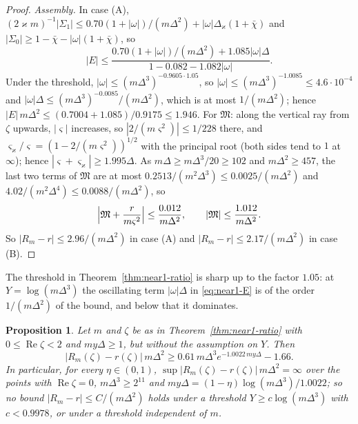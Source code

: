 \documentclass[11pt]{amsart}
\newtheorem{proposition}[theorem]{Proposition}
\theoremstyle{definition}
\theoremstyle{remark}
\numberwithin{equation}{section}
\DeclareMathOperator{\re}{Re}
\begin{document}
\begin{proof}
\emph{Assembly.} In case (A), $(2\varkappa m)^{-1}|\Sigma_1|\le0.70(1+|\omega|)/(m\Delta^2)+|\omega|\Delta_\varkappa(1+\bar\chi)$ and $|\Sigma_0|\ge1-\bar\chi-|\omega|(1+\bar\chi)$, so
\begin{equation}\label{eq:near1-E}
|E|\le\frac{0.70(1+|\omega|)/(m\Delta^2)+1.085|\omega|\Delta}{1-0.082-1.082|\omega|}.
\end{equation}
Under the threshold, $|\omega|\le(m\Delta^3)^{-0.9605\cdot1.05}$, so $|\omega|\le(m\Delta^3)^{-1.0085}\le4.6\cdot10^{-4}$ and $|\omega|\Delta\le(m\Delta^3)^{-0.0085}/(m\Delta^2)$, which is at most $1/(m\Delta^2)$; hence $|E|\,m\Delta^2\le(0.7004+1.085)/0.9175\le1.946$. For $\mathfrak M$: along the vertical ray from $\zeta$ upwards, $|\varsigma|$ increases, so $|2/(m\varsigma^2)|\le1/228$ there, and $\varsigma_\varkappa/\varsigma=(1-2/(m\varsigma^2))^{1/2}$ with the principal root (both sides tend to $1$ at $\infty$); hence $|\varsigma+\varsigma_\varkappa|\ge1.995\Delta$. As $m\Delta\ge m\Delta^3/20\ge102$ and $m\Delta^2\ge457$, the last two terms of $\mathfrak M$ are at most $0.2513/(m^2\Delta^3)\le0.0025/(m\Delta^2)$ and $4.02/(m^2\Delta^4)\le0.0088/(m\Delta^2)$, so
\begin{equation}\label{eq:near1-M}
\Bigl|\mathfrak M+\frac r{m\varsigma^2}\Bigr|\le\frac{0.012}{m\Delta^2},\qquad|\mathfrak M|\le\frac{1.012}{m\Delta^2}.
\end{equation}
So $|R_m-r|\le2.96/(m\Delta^2)$ in case (A) and $|R_m-r|\le2.17/(m\Delta^2)$ in case (B).
\end{proof}

The threshold in Theorem~\ref{thm:near1-ratio} is sharp up to the factor $1.05$: at $Y=\log(m\Delta^3)$ the oscillating term $|\omega|\Delta$ in \eqref{eq:near1-E} is of the order $1/(m\Delta^2)$ of the bound, and below that it dominates.

\begin{proposition}\label{prop:near1-sharp}
Let $m$ and $\zeta$ be as in Theorem~\ref{thm:near1-ratio} with $0\le\re\zeta<2$ and $my\Delta\ge1$, but without the assumption on $Y$. Then
\[
|R_m(\zeta)-r(\zeta)|\,m\Delta^2\ge0.61\,m\Delta^3e^{-1.0022\,my\Delta}-1.66 .
\]
In particular, for every $\eta\in(0,1)$, $\sup|R_m(\zeta)-r(\zeta)|\,m\Delta^2=\infty$ over the points with $\re\zeta=0$, $m\Delta^3\ge2^{11}$ and $my\Delta=(1-\eta)\log(m\Delta^3)/1.0022$; so no bound $|R_m-r|\le C/(m\Delta^2)$ holds under a threshold $Y\ge c\log(m\Delta^3)$ with $c<0.9978$, or under a threshold independent of $m$.
\end{proposition}
\end{document}
